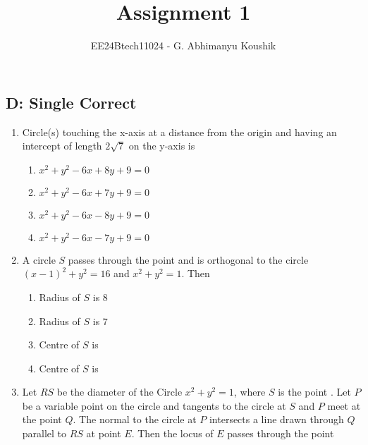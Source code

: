 \documentclass[journal,12pt,twocolumn]{IEEEtran}
\theoremstyle{remark}
\begin{document}
\title{Assignment 1}
\author{EE24Btech11024 - G. Abhimanyu Koushik}
\maketitle
\renewcommand{\thefigure}{\theenumi}
\renewcommand{\thetable}{\theenumi}
\subsection*{D: Single Correct}
\begin{enumerate}
\item Circle(s) touching the x-axis at a distance  from the origin and having an intercept of length $2\sqrt{7}$ on the y-axis is 

\hfill{}
\begin{enumerate}[label=(\alph*)]
\item $x^2 + y^2 - 6x + 8y + 9 = 0$
\item $x^2 + y^2 - 6x + 7y + 9 = 0$
\item $x^2 + y^2 - 6x - 8y + 9 = 0$
\item $x^2 + y^2 - 6x - 7y + 9 = 0$
\end{enumerate}
\item A circle $\textit{S}$ passes through the point  and is orthogonal to the circle $(x-1)^2+y^2=16$ and $x^2+y^2=1$. Then

\hfill {}
\begin{enumerate}[label=(\alph*)]
\item Radius of $\textit{S}$ is $8$
\item Radius of $\textit{S}$ is $7$
\item Centre of $\textit{S}$ is 
\item Centre of $\textit{S}$ is 
\end{enumerate}
\item Let $\textit{RS}$ be the diameter of the Circle $x^{2} + y^{2} = 1$, where $\textit{S}$ is the point . Let $\textit{P}$ be a variable point  on the circle and tangents to the circle at $\textit{S}$ and $\textit{P}$ meet at the point $\textit{Q}$. The normal to the circle at $\textit{P}$ intersects a line drawn through $\textit{Q}$ parallel to $\textit{RS}$ at point $\textit{E}$. Then the locus of $\textit{E}$ passes through the point 


\end{enumerate}
\end{document}
